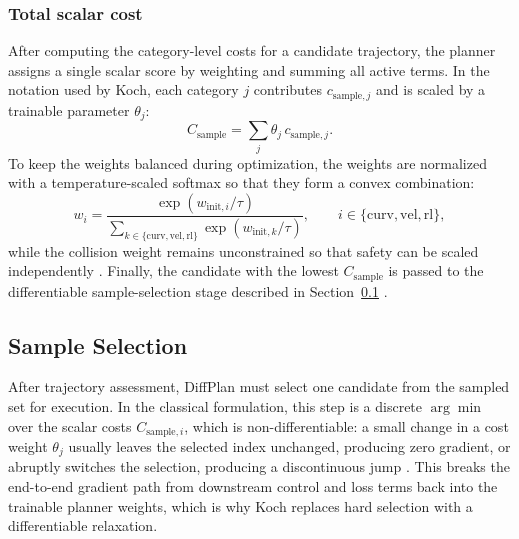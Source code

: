 \subsubsection{Total scalar cost}
After computing the category-level costs for a candidate trajectory, the planner assigns a single scalar score by weighting and summing all active terms.
In the notation used by Koch, each category $j$ contributes $c_{\text{sample}, j}$ and is scaled by a trainable parameter $\theta_j$:
\begin{equation}
    C_{\text{sample}} = \sum_j \theta_j \, c_{\text{sample}, j}.
    \label{eq:DiffPlanTotalCost}
\end{equation}
To keep the weights balanced during optimization, the weights are normalized with a temperature-scaled softmax so that they form a convex combination:
\begin{equation}
    w_i = \frac{\exp(w_{\text{init}, i} / \tau)}{\sum_{k \in \{\text{curv}, \text{vel}, \text{rl}\}} \exp(w_{\text{init}, k} / \tau)}, \qquad i \in \{\text{curv}, \text{vel}, \text{rl}\},
\end{equation}
while the collision weight remains unconstrained so that safety can be scaled independently \cite{swadiryus_DifferentiableMotionPlanning_2025}.
Finally, the candidate with the lowest $C_{\text{sample}}$ is passed to the differentiable sample-selection stage described in Section~\ref{subsection:SampleSelection} \cite{koch_DifferentiableInterpretablePath_2025}.

\subsection{Sample Selection}
\label{subsection:SampleSelection}

After trajectory assessment, DiffPlan must select one candidate from the sampled set for execution.
In the classical formulation, this step is a discrete $\arg\min$ over the scalar costs $C_{\text{sample}, i}$, which is non-differentiable: a small change in a cost weight $\theta_j$ usually leaves the selected index unchanged, producing zero gradient, or abruptly switches the selection, producing a discontinuous jump \cite{koch_DifferentiableInterpretablePath_2025}.
This breaks the end-to-end gradient path from downstream control and loss terms back into the trainable planner weights, which is why Koch \cite{koch_DifferentiableInterpretablePath_2025} replaces hard selection with a differentiable relaxation.

